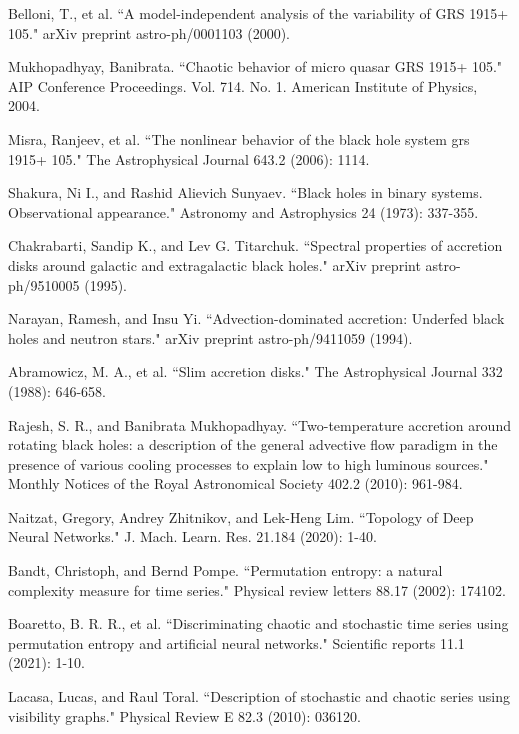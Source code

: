 \documentclass[10pt,conference]{IEEEtran}
\begin{document}
\begin{thebibliography}{1}

Belloni, T., et al. ``A model-independent analysis of the variability of GRS 1915+ 105." arXiv preprint astro-ph/0001103 (2000).

Mukhopadhyay, Banibrata. ``Chaotic behavior of micro quasar GRS 1915+ 105." AIP Conference Proceedings. Vol. 714. No. 1. American Institute of Physics, 2004.

Misra, Ranjeev, et al. ``The nonlinear behavior of the black hole system grs 1915+ 105." The Astrophysical Journal 643.2 (2006): 1114.

Shakura, Ni I., and Rashid Alievich Sunyaev. ``Black holes in binary systems. Observational appearance." Astronomy and Astrophysics 24 (1973): 337-355.

Chakrabarti, Sandip K., and Lev G. Titarchuk. ``Spectral properties of accretion disks around galactic and extragalactic black holes." arXiv preprint astro-ph/9510005 (1995).

Narayan, Ramesh, and Insu Yi. ``Advection-dominated accretion: Underfed black holes and neutron stars." arXiv preprint astro-ph/9411059 (1994).

Abramowicz, M. A., et al. ``Slim accretion disks." The Astrophysical Journal 332 (1988): 646-658.

Rajesh, S. R., and Banibrata Mukhopadhyay. ``Two-temperature accretion around rotating black holes: a description of the general advective flow paradigm in the presence of various cooling processes to explain low to high luminous sources." Monthly Notices of the Royal Astronomical Society 402.2 (2010): 961-984.

Naitzat, Gregory, Andrey Zhitnikov, and Lek-Heng Lim. ``Topology of Deep Neural Networks." J. Mach. Learn. Res. 21.184 (2020): 1-40.

Bandt, Christoph, and Bernd Pompe. ``Permutation entropy: a natural complexity measure for time series." Physical review letters 88.17 (2002): 174102.

Boaretto, B. R. R., et al. ``Discriminating chaotic and stochastic time series using permutation entropy and artificial neural networks." Scientific reports 11.1 (2021): 1-10.

Lacasa, Lucas, and Raul Toral. ``Description of stochastic and chaotic series using visibility graphs." Physical Review E 82.3 (2010): 036120.


\end{thebibliography}
\end{document}
